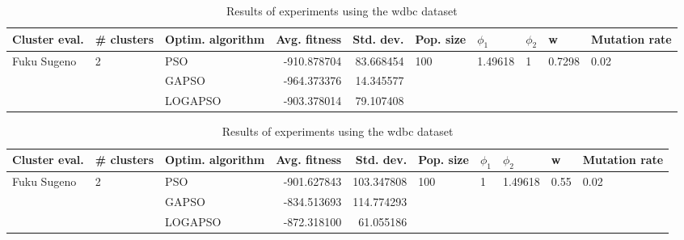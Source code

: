 \documentclass{article}
\begin{document}
\begin{table}
\centering
\caption{Results of experiments using the wdbc dataset}
\begin{tabular}{lllrrlllll}
\toprule
               Cluster eval. &        \# clusters & Optim. algorithm &  Avg. fitness &  Std. dev. &            Pop. size &               $\phi_{1}$ &         $\phi_{2}$ &                       w &         Mutation rate \\
\midrule
\multirow{3}{*}{Fuku Sugeno} & \multirow{3}{*}{2} &              PSO &   -910.878704 &  83.668454 & \multirow{3}{*}{100} & \multirow{3}{*}{1.49618} & \multirow{3}{*}{1} & \multirow{3}{*}{0.7298} & \multirow{3}{*}{0.02} \\
                             &                    &            GAPSO &   -964.373376 &  14.345577 &                      &                          &                    &                         &                       \\
                             &                    &          LOGAPSO &   -903.378014 &  79.107408 &                      &                          &                    &                         &                       \\
\bottomrule
\end{tabular}
\end{table}
\begin{table}
\centering
\caption{Results of experiments using the wdbc dataset}
\begin{tabular}{lllrrlllll}
\toprule
               Cluster eval. &        \# clusters & Optim. algorithm &  Avg. fitness &  Std. dev. &            Pop. size &         $\phi_{1}$ &               $\phi_{2}$ &                     w &         Mutation rate \\
\midrule
\multirow{3}{*}{Fuku Sugeno} & \multirow{3}{*}{2} &              PSO &   -901.627843 & 103.347808 & \multirow{3}{*}{100} & \multirow{3}{*}{1} & \multirow{3}{*}{1.49618} & \multirow{3}{*}{0.55} & \multirow{3}{*}{0.02} \\
                             &                    &            GAPSO &   -834.513693 & 114.774293 &                      &                    &                          &                       &                       \\
                             &                    &          LOGAPSO &   -872.318100 &  61.055186 &                      &                    &                          &                       &                       \\
\bottomrule
\end{tabular}
\end{table}
\end{document}
